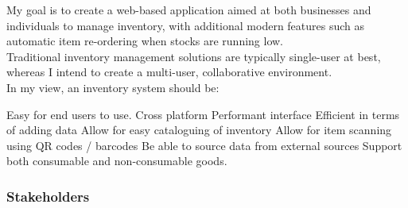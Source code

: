 \documentclass{article}
\begin{document}
\noindent My goal is to create a web-based application aimed at both businesses and individuals to manage
inventory, with additional modern features such as automatic item re-ordering when stocks are running low.\\

\noindent Traditional inventory management solutions are typically single-user at best, whereas I intend to create
a multi-user, collaborative environment.\\

\noindent In my view, an inventory system should be:

\begin{outline}
    \1 Easy for end users to use.
    \1 Cross platform
    \1 Performant interface
    \1 Efficient in terms of adding data
    \1 Allow for easy cataloguing of inventory
    \1 Allow for item scanning using QR codes / barcodes
    \1 Be able to source data from external sources
    \1 Support both consumable and non-consumable goods.

    
\end{outline}

\subsubsection{Stakeholders}
\end{document}
